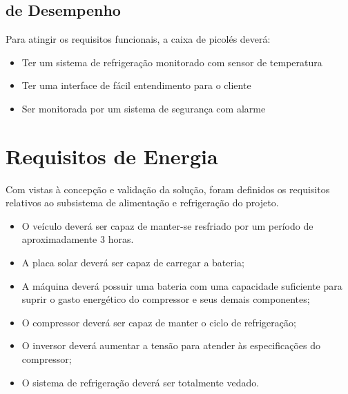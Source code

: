 \subsection{de Desempenho}
Para atingir os requisitos funcionais, a caixa de picolés deverá:
\begin{itemize}
\item  Ter um sistema de refrigeração monitorado com sensor de temperatura
\item  Ter uma interface de fácil entendimento para o cliente
\item  Ser monitorada por um sistema de segurança com alarme
\end{itemize}

\section{Requisitos de Energia}

Com vistas à concepção e validação da solução, foram definidos os requisitos relativos ao subsistema de alimentação e refrigeração do projeto.

	\begin{itemize}

	
   \item O veículo deverá ser capaz de manter-se resfriado por um período de aproximadamente 3 horas.
   
   \item A placa solar deverá ser capaz de carregar a bateria;
   
   \item A máquina deverá possuir uma bateria com uma capacidade suficiente para suprir o gasto energético do compressor e seus demais componentes;
   
   \item O compressor deverá ser capaz de manter o ciclo de refrigeração;
   
   \item O inversor deverá aumentar a tensão para atender às especificações do compressor;
   
   \item O sistema de refrigeração deverá ser totalmente vedado.
   \end{itemize}